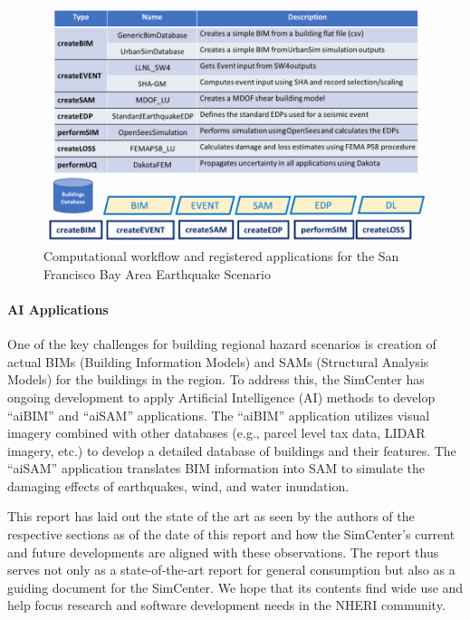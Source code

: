 \begin{figure}[htb]
    \centering
    \includegraphics[width=1.0\textwidth, angle = 0]{Figures/CompWorkflow.pdf}
    \caption{Computational workflow and registered applications for the San Francisco Bay Area Earthquake Scenario}
    \label{fig:intro_CompWorkflow}
\end{figure}

\paragraph{AI Applications} One of the key challenges for building regional hazard scenarios is creation of actual BIMs (Building Information Models) and SAMs (Structural Analysis Models) for the buildings in the region. To address this, the SimCenter has ongoing development to apply Artificial Intelligence (AI) methods to develop ``aiBIM'' and ``aiSAM'' applications. The ``aiBIM'' application utilizes visual imagery combined with other databases (e.g., parcel level tax data, LIDAR imagery, etc.) to develop a detailed database of buildings and their features. The ``aiSAM'' application translates BIM information into SAM to simulate the damaging effects of earthquakes, wind, and water inundation.

\noindent This report has laid out the state of the art as seen by the authors of the respective sections as of the date of this report and how the SimCenter's current and future developments are aligned with these observations. The report thus serves not only as a state-of-the-art report for general consumption but also as a guiding document for the SimCenter. We hope that its contents find wide use and help focus research and software development needs in the NHERI community.